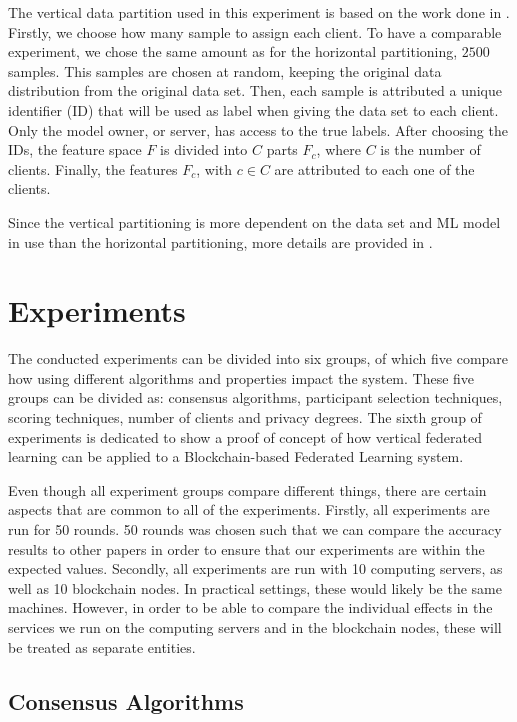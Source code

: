 The vertical data partition used in this experiment is based on the work done in \cite{10.48550/arxiv.2104.00489}. Firstly, we choose how many sample to assign each client. To have a comparable experiment, we chose the same amount as for the horizontal partitioning, $2500$ samples. This samples are chosen at random, keeping the original data distribution from the original data set. Then, each sample is attributed a unique identifier (ID) that will be used as label when giving the data set to each client. Only the model owner, or server, has access to the true labels. After choosing the IDs, the feature space $F$ is divided into $C$ parts $F_c$, where $C$ is the number of clients. Finally, the features $F_c$, with $c \in C$ are attributed to each one of the clients.

Since the vertical partitioning is more dependent on the data set and ML model in use than the horizontal partitioning, more details are provided in .

\section{Experiments}

The conducted experiments can be divided into six groups, of which five compare how using different algorithms and properties impact the system. These five groups can be divided as: consensus algorithms, participant selection techniques, scoring techniques, number of clients and privacy degrees. The sixth group of experiments is dedicated to show a proof of concept of how vertical federated learning can be applied to a Blockchain-based Federated Learning system.

Even though all experiment groups compare different things, there are certain aspects that are common to all of the experiments. Firstly, all experiments are run for 50 rounds. 50 rounds was chosen such that we can compare the accuracy results to other papers in order to ensure that our experiments are within the expected values. Secondly, all experiments are run with 10 computing servers, as well as 10 blockchain nodes. In practical settings, these would likely be the same machines. However, in order to be able to compare the individual effects in the services we run on the computing servers and in the blockchain nodes, these will be treated as separate entities.

\subsection{Consensus Algorithms}

